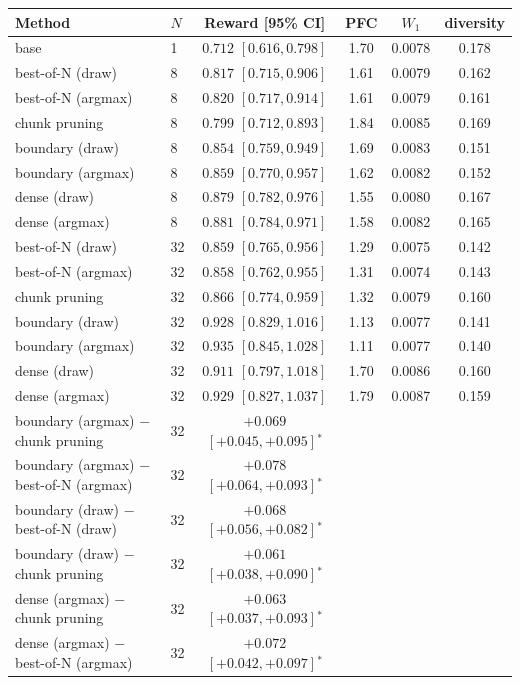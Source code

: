 \begin{tabular}{llcccc}
\toprule
Method & $N$ & Reward [95\% CI] & PFC & $W_1$ & diversity \\
\midrule
base & 1 & $0.712$ $[0.616, 0.798]$ & 1.70 & 0.0078 & 0.178 \\
best-of-N (draw) & 8 & $0.817$ $[0.715, 0.906]$ & 1.61 & 0.0079 & 0.162 \\
best-of-N (argmax) & 8 & $0.820$ $[0.717, 0.914]$ & 1.61 & 0.0079 & 0.161 \\
chunk pruning & 8 & $0.799$ $[0.712, 0.893]$ & 1.84 & 0.0085 & 0.169 \\
boundary (draw) & 8 & $0.854$ $[0.759, 0.949]$ & 1.69 & 0.0083 & 0.151 \\
boundary (argmax) & 8 & $0.859$ $[0.770, 0.957]$ & 1.62 & 0.0082 & 0.152 \\
dense (draw) & 8 & $0.879$ $[0.782, 0.976]$ & 1.55 & 0.0080 & 0.167 \\
dense (argmax) & 8 & $0.881$ $[0.784, 0.971]$ & 1.58 & 0.0082 & 0.165 \\
best-of-N (draw) & 32 & $0.859$ $[0.765, 0.956]$ & 1.29 & 0.0075 & 0.142 \\
best-of-N (argmax) & 32 & $0.858$ $[0.762, 0.955]$ & 1.31 & 0.0074 & 0.143 \\
chunk pruning & 32 & $0.866$ $[0.774, 0.959]$ & 1.32 & 0.0079 & 0.160 \\
boundary (draw) & 32 & $0.928$ $[0.829, 1.016]$ & 1.13 & 0.0077 & 0.141 \\
boundary (argmax) & 32 & $0.935$ $[0.845, 1.028]$ & 1.11 & 0.0077 & 0.140 \\
dense (draw) & 32 & $0.911$ $[0.797, 1.018]$ & 1.70 & 0.0086 & 0.160 \\
dense (argmax) & 32 & $0.929$ $[0.827, 1.037]$ & 1.79 & 0.0087 & 0.159 \\
\midrule
boundary (argmax) $-$ chunk pruning & 32 & $+0.069$ $[+0.045, +0.095]$$^*$ & & & \\
boundary (argmax) $-$ best-of-N (argmax) & 32 & $+0.078$ $[+0.064, +0.093]$$^*$ & & & \\
boundary (draw) $-$ best-of-N (draw) & 32 & $+0.068$ $[+0.056, +0.082]$$^*$ & & & \\
boundary (draw) $-$ chunk pruning & 32 & $+0.061$ $[+0.038, +0.090]$$^*$ & & & \\
dense (argmax) $-$ chunk pruning & 32 & $+0.063$ $[+0.037, +0.093]$$^*$ & & & \\
dense (argmax) $-$ best-of-N (argmax) & 32 & $+0.072$ $[+0.042, +0.097]$$^*$ & & & \\

\end{tabular}
